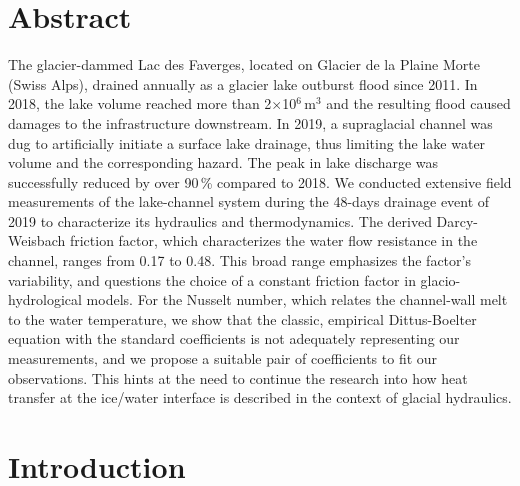 \section{Abstract}

The glacier-dammed Lac des Faverges, located on Glacier de la Plaine Morte (Swiss Alps), drained annually as a glacier lake outburst flood since 2011. In 2018, the lake volume reached more than 2$\times$10$^6$\,m$^3$ and the resulting flood caused damages to the infrastructure downstream. In 2019, a supraglacial channel was dug to artificially initiate a surface lake drainage, thus limiting the lake water volume and the corresponding hazard. The peak in lake discharge was successfully reduced by over 90\,\% compared to 2018. We conducted extensive field measurements of the lake-channel system during the 48-days drainage event of 2019 to characterize its hydraulics and thermodynamics. The derived Darcy-Weisbach friction factor, which characterizes the water flow resistance in the channel, ranges from 0.17 to 0.48. This broad range emphasizes the factor’s variability, and questions the choice of a constant friction factor in glacio-hydrological models. For the Nusselt number, which relates the channel-wall melt to the water temperature, we show that the classic, empirical Dittus-Boelter equation with the standard coefficients is not adequately representing our measurements, and we propose a suitable pair of coefficients to fit our observations. This hints at the need to continue the research into how heat transfer at the ice/water interface is described in the context of glacial hydraulics.

\section{Introduction}


